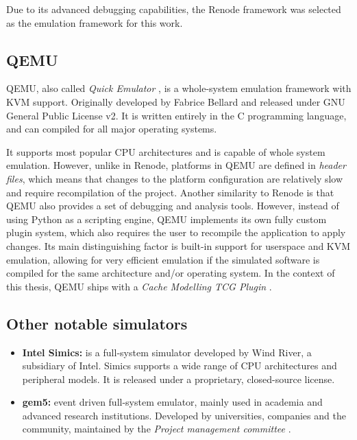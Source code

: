 \noindent Due to its advanced debugging capabilities, the Renode framework was selected as the emulation framework for this work.

\subsection{QEMU}

QEMU, also called \textit{Quick Emulator} \cite{qemuoriginal}, is a whole-system emulation framework with KVM support. Originally developed by Fabrice Bellard \cite{qemufabrice} and released
under GNU General Public License v2. It is written entirely in the C programming language, and can compiled for all major operating systems.

It supports most popular CPU architectures and is capable of whole system emulation.
However, unlike in Renode, platforms in QEMU are defined in \textit{header files}, which means
that changes to the platform configuration are relatively slow and require recompilation of the project. Another similarity to Renode is that QEMU also provides a set of debugging
and analysis tools. However, instead of using Python as a scripting engine, QEMU implements its own fully custom plugin system, which also requires the user to recompile the
application to apply changes. Its main distinguishing factor is built-in support for userspace and KVM emulation, allowing for very efficient emulation if the simulated software is
compiled for the same architecture and/or operating system. In the context of this thesis, QEMU ships with a \textit{Cache Modelling TCG Plugin} \cite{tcgcachemodelling}.

\subsection{Other notable simulators}

\begin{itemize} %
	\item \textbf{Intel Simics:} is a full-system simulator developed by Wind River, a subsidiary of Intel. Simics supports a wide range of CPU architectures and peripheral models.
		It is released under a proprietary, closed-source license.
	\item \textbf{gem5:} event driven full-system emulator, mainly used in academia and advanced research institutions. Developed by universities, companies and the community, maintained by the
		\textit{Project management committee} \cite{gem5governance}. %
\end{itemize}

